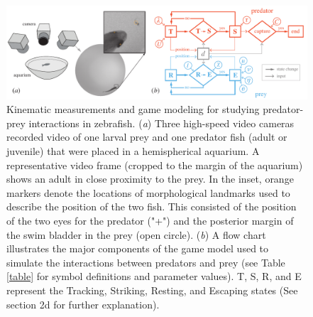 \documentclass[]{rsos}%
\begin{document}
\pagebreak

\linespread{1}\selectfont %


\begin{figure}[!h]
\centering
	\includegraphics[width=5.5in]{fig_setup}
\caption{
Kinematic measurements and game modeling for studying predator-prey interactions in zebrafish. 
(\textit{a}) Three high-speed video cameras recorded video of one larval prey and one predator fish (adult or juvenile) that were placed in a hemispherical aquarium. 
A representative video frame (cropped to the margin of the aquarium) shows an adult in close proximity to the prey. 
In the inset, orange markers denote the locations of morphological landmarks used to describe the position of the two fish.
This consisted of the position of the two eyes for the predator ("+") and the posterior margin of the swim bladder in the prey (open circle). 
 (\textit{b}) A flow chart illustrates the major components of the game model used to simulate the interactions between predators and prey (see Table \ref{table} for symbol definitions and parameter values). T, S, R, and E represent the Tracking, Striking, Resting, and Escaping states (See section 2d for further explanation).
 }
\label{fig_setup}
\end{figure}

\pagebreak
\end{document}
